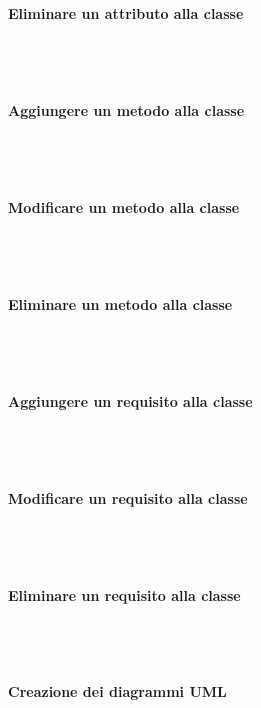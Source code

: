 \paragraph{Eliminare un attributo alla classe} \mbox{}\\ \mbox{}\\

\paragraph{Aggiungere un metodo alla classe} \mbox{}\\ \mbox{}\\

\paragraph{Modificare un metodo alla classe} \mbox{}\\ \mbox{}\\

\paragraph{Eliminare un metodo alla classe} \mbox{}\\ \mbox{}\\

\paragraph{Aggiungere un requisito alla classe} \mbox{}\\ \mbox{}\\

\paragraph{Modificare un requisito alla classe} \mbox{}\\ \mbox{}\\

\paragraph{Eliminare un requisito alla classe} \mbox{}\\ \mbox{}\\

\paragraph{Creazione dei diagrammi UML} \mbox{}\\ \mbox{}\\

